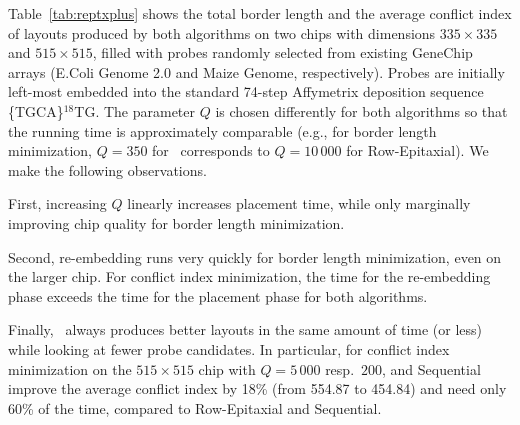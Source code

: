 Table~\ref{tab:reptxplus} shows the total border length and the
average conflict index of layouts produced by both algorithms on two
chips with dimensions $335 \times 335$ and $515 \times 515$, filled
with probes randomly selected from existing GeneChip arrays (E.Coli
Genome 2.0 and Maize Genome, respectively). Probes are initially
left-most embedded into the standard 74-step Affymetrix deposition
sequence \{TGCA\}$^{18}$TG. The parameter $Q$ is chosen differently
for both algorithms so that the running time is approximately
comparable (e.g., for border length minimization, $Q=350$ for
\Greedyplus\ corresponds to $Q=10\,000$ for Row-Epitaxial). We make
the following observations.

First, increasing $Q$ linearly increases placement time, while only
marginally improving chip quality for border length minimization.

Second, re-embedding runs very quickly for border length minimization,
even on the larger chip. For conflict index minimization, the time for
the re-embedding phase exceeds the time for the placement phase for
both algorithms.

Finally, \Greedyplus\ always produces better layouts in the same amount of
time (or less) while looking at fewer probe candidates.  In particular, for
conflict index minimization on the $515\times 515$ chip with $Q=5\,000$ resp.\ 
$200$, \Greedyplus\;and Sequential improve the average conflict index by 18\%
(from 554.87 to 454.84) and need only 60\% of the time, compared to
Row-Epitaxial and Sequential.
